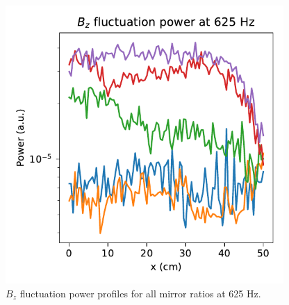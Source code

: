 \begin{figure}
    \centering
    \includegraphics[width=300pt]{figures/Bz-fluct-profile_625-Hz}
    \caption[$B_z$ fluctuation power profiles for low frequencies]{$B_z$ fluctuation power profiles for all mirror ratios at 625 Hz. }
    \label{fig:B_z_625Hz}
\end{figure}

